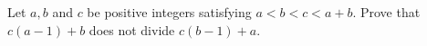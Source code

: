 Let $a,b$ and $c$ be positive integers satisfying $a<b<c<a+b$. Prove that $c(a-1)+b$ does not divide $c(b-1)+a$.